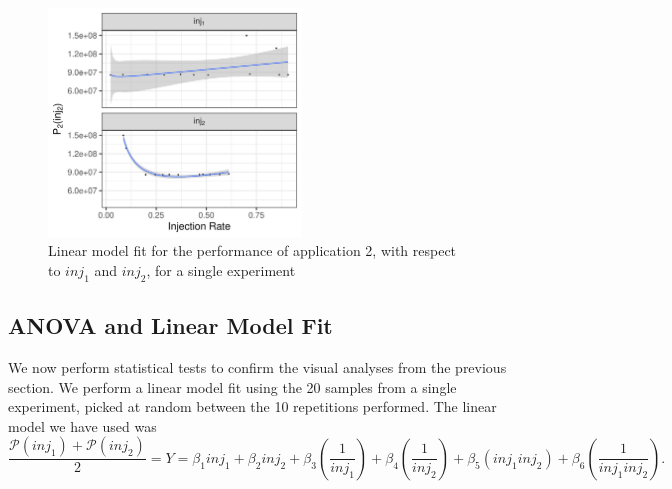 \documentclass[a4paper]{article}
\begin{document}
\begin{figure}[h]
\centering
\includegraphics[width=0.6\textwidth]{./img/2_apps_min_mean_time/rs_20_samples_10_iterations_scatter_app2_weighted_full.pdf}
\caption{Linear model fit for the performance of application 2, with respect to \(inj_1\) and \(inj_2\), for a single experiment}
\end{figure}

\subsection{ANOVA and Linear Model Fit}
\label{sec:org983953b}
We  now perform  statistical  tests  to confirm  the  visual  analyses from  the
previous section.   We perform a  linear model fit using  the 20 samples  from a
single experiment, picked  at random between the 10  repetitions performed.  The
linear model we have used was
\begin{equation*}
\dfrac{\mathcal{P}(inj_1) + \mathcal{P}(inj_2)}{2} =
Y = \beta_{1}inj_1 +
\beta_{2}inj_2 +
\beta_{3}\left(\dfrac{1}{inj_1}\right) +
\beta_{4}\left(\dfrac{1}{inj_2}\right) +
\beta_{5}\left(inj_{1}inj_{2}\right) +
\beta_{6}\left(\dfrac{1}{inj_{1}inj_2}\right)\text{.}
\end{equation*}
\end{document}
